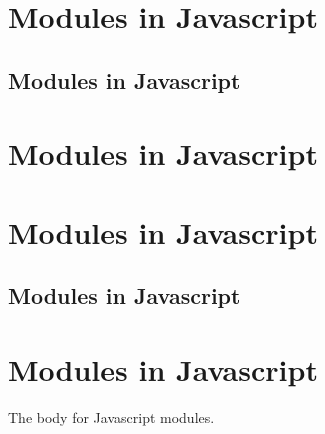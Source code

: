 %
%
%

\ifdefined\CntLIHeadingHeadingType
\else
    \newcommand{\CntLIHeadingHeadingType}[1]{
        \ifdefined\CntLIHeadingSection
            \section{#1}
        \else
            \ifdefined\CntLIHeadingSubSection
                \subsection{#1}
            \else
                \section{#1}
            \fi
        \fi
    }
\fi

\newcommand{\CntLIHeadingJavascriptModulesText}{\CntLIHeadingHeadingType{Modules in Javascript}\label{sec:javascript-modules-1.0.0}}

\ifdefined\CntLIHeading
    \CntLIHeadingJavascriptModulesText
\else
    \ifdefined\CntLIHeadingJavascriptModulesVIvOvO
        \CntLIHeadingJavascriptModulesText
    \fi
\fi

The body for Javascript modules.
